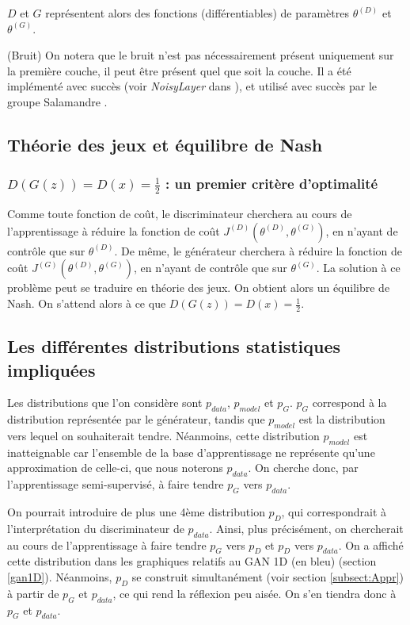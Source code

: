 $D$ et $G$ représentent alors des fonctions (différentiables) de paramètres $\theta^{(D)}$ et $\theta^{(G)}$.\\

\begin{remark}(Bruit)
On notera que le bruit n'est pas nécessairement présent uniquement sur la première couche, il peut être présent quel que soit la couche. Il a été implémenté avec succès (voir \textit{NoisyLayer} dans \cite{barrios_gan_2018}), et utilisé avec succès par le groupe Salamandre \cite{bouvier_dyvoire_dessine-moi_2018}.
\end{remark}
\subsection{Théorie des jeux et équilibre de Nash}
\subsubsection{$D(G(z)) = D(x) = \frac{1}{2}$ : un premier critère d'optimalité}
Comme toute fonction de coût, le discriminateur cherchera au cours de l'apprentissage à réduire la fonction de coût $J^{(D)}(\theta^{(D)}, \theta^{(G)})$, en n'ayant de contrôle que sur $\theta^{(D)}$. De même, le générateur cherchera à réduire la fonction de coût $J^{(G)}(\theta^{(D)}, \theta^{(G)})$, en n'ayant de contrôle que sur $\theta^{(G)}$. 
La solution à ce problème peut se traduire en théorie des jeux. On obtient alors un équilibre de Nash. On s'attend alors à ce que $D(G(z)) = D(x) = \frac{1}{2}$. 

\subsection{Les différentes distributions statistiques impliquées}
Les distributions que l'on considère sont $p_{data}$, $p_{model}$ et $p_{G}$. $p_{G}$ correspond à la distribution représentée par le générateur, tandis que $p_{model}$ est la distribution vers lequel on souhaiterait tendre. Néanmoins, cette distribution $p_{model}$ est inatteignable car l'ensemble de la base d'apprentissage ne représente qu'une approximation de celle-ci, que nous noterons $p_{data}$. On cherche donc, par l'apprentissage semi-supervisé, à faire tendre $p_{G}$ vers $p_{data}$. \\
\begin{remark}
On pourrait introduire de plus une 4ème distribution $p_{D}$, qui correspondrait à l'interprétation du discriminateur de $p_{data}$. Ainsi, plus précisément, on chercherait au cours de l'apprentissage à faire tendre $p_{G}$ vers $p_{D}$ et $p_{D}$ vers $p_{data}$. On a affiché cette distribution dans les graphiques relatifs au GAN 1D (en bleu) (section \ref{gan1D}). Néanmoins, $p_{D}$ se construit simultanément (voir section \ref{subsect:Appr}) à partir de $p_{G}$ et $p_{data}$, ce qui rend la réflexion peu aisée. On s'en tiendra donc à  $p_{G}$ et $p_{data}$.
\end{remark}
